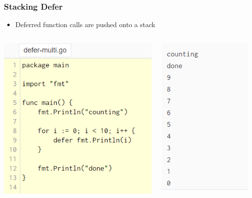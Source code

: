 \documentclass[14pt]{beamer}
\begin{document}
{
\begin{frame}
    \frametitle{Stacking Defer}
    \begin{itemize}
        \item Deferred function calls are pushed onto a stack
    \end{itemize}
    \begin{columns}
        \begin{column}{0.5\textwidth}
        \includegraphics[width=0.9\linewidth]{img/stackdefer.PNG}
        \end{column}
        \begin{column}{0.5\textwidth}
        \includegraphics[width=0.5\linewidth]{img/defeeoutput.PNG}
        \end{column}
    \end{columns}
\end{frame}
}
\end{document}
